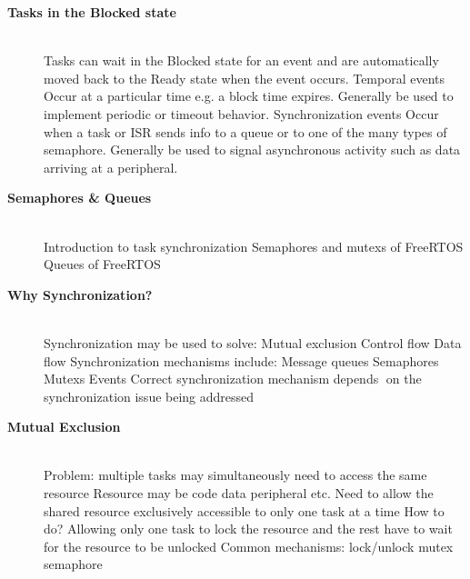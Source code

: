 \begin{description}
\item[{\rot\bf Tasks in the Blocked state}]~\\[-3ex]
\bi
\ite Tasks can wait in the Blocked state for an event and are automatically moved back to the Ready state when the event occurs.
\ite Temporal events
\bi
\ite Occur at a particular time e.g. a block time expires.
\ite Generally be used to implement periodic or timeout behavior.
\ei
\ite Synchronization events
\bi
\ite Occur when a task or ISR sends info to a queue or to one of the many types of semaphore.
\ite Generally be used to signal asynchronous activity such as data arriving at a peripheral.
\ei
\ite
\ei

\os{\newpage}



\item[{\rot\bf Semaphores & Queues}]~\\[-3ex]
\bi
\ite Introduction to task synchronization
\ite Semaphores and mutexs of FreeRTOS
\ite Queues of FreeRTOS
\ei

\os{\newpage}



\item[{\rot\bf Why Synchronization?}]~\\[-3ex]
\bi
\ite Synchronization may be used to solve:
\bi
\ite Mutual exclusion
\ite Control flow
\ite Data flow
\ei
\ite Synchronization mechanisms include:
\bi
\ite Message queues
\ite Semaphores
\ite Mutexs
\ite Events
\ei
\ite Correct synchronization mechanism depends on the synchronization issue being addressed
\ei

\os{\newpage}



\item[{\rot\bf Mutual Exclusion}]~\\[-3ex]
\bi
\ite Problem: multiple tasks may simultaneously need to access the same resource
\bi
\ite Resource may be code data peripheral etc.
\ite Need to allow the shared resource exclusively accessible to only one task at a time
\ei
\ite How to do?
\bi
\ite Allowing only one task to lock the resource and the rest have to wait for the resource to be unlocked
\ite Common mechanisms: lock/unlock mutex semaphore
\ei
\ei


\end{description}
